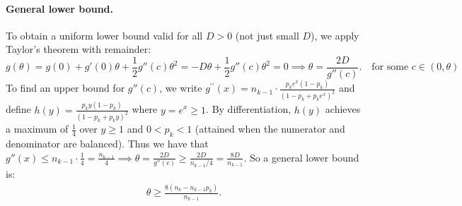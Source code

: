 \paragraph{General lower bound.} To obtain a uniform lower bound valid for all $D>0$ (not just small $D$), we apply Taylor's theorem with remainder:
$$g(\theta) = g(0) + g'(0) \theta + \frac{1}{2} g''(c) \theta^2 = -D \theta + \frac{1}{2} g''(c) \theta^2 = 0\implies \theta = \frac{2D}{g''(c)}. \quad \text{for some } c \in (0, \theta)$$
To find an upper bound for \(g''(c)\), we write $g^{\prime \prime}(x) = n_{k-1} \cdot \frac{p_k e^{x} (1 - p_k)}{(1 - p_k + p_k e^{x})^2}$ and define \(h(y) = \frac{p_k y (1 - p_k)}{(1 - p_k + p_k y)^2}\) where \(y = e^{x} \geq 1\). By differentiation, \(h(y)\) achieves a maximum of \(\frac{1}{4}\) over $y\geq 1$ and $0<p_k<1$ (attained when the numerator and denominator are balanced). Thus we have that $
g''(x) \leq n_{k-1} \cdot \frac{1}{4} = \frac{n_{k-1}}{4} \implies \theta = \frac{2D}{g''(c)} \geq \frac{2D}{n_{k-1}/4} = \frac{8D}{n_{k-1}}$. So a general lower bound is:
\begin{align}
    \theta \geq \frac{8 (n_k - n_{k-1} p_k)}{n_{k-1}}.\label{eq::theta lower bound}
\end{align}
